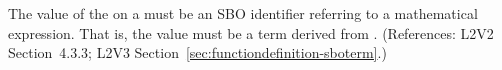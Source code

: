 The value of the   on a \FunctionDefinition must be an
SBO identifier referring to a mathematical expression.  That is, the value
must be a term derived from \sbomathformula.  (References: L2V2 Section~4.3.3;
L2V3 Section~\ref{sec:functiondefinition-sboterm}.)
